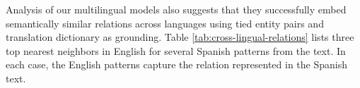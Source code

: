 Analysis of our multilingual models also suggests that they successfully embed semantically similar relations across languages using tied entity pairs and translation dictionary as grounding. Table \ref{tab:cross-lingual-relations} lists three top nearest neighbors in English for several Spanish patterns from the text. In each case, the English patterns capture the relation represented in the Spanish text. 

